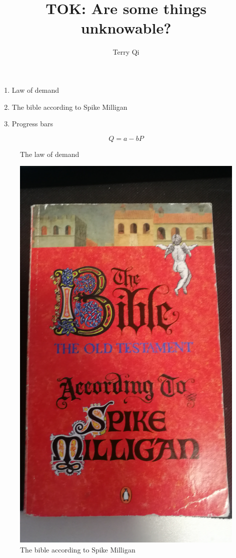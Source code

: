 \documentclass[a4paper,12pt]{article}
\title{TOK: Are some things unknowable?}
\author{Terry Qi}
\begin{document}
\maketitle
\begin{enumerate}
 \item Law of demand
 \item The bible according to Spike Milligan
 \item Progress bars
\end{enumerate}

\begin{figure}[h!]
 \centering
 \[
    Q = a - bP
 \]
 \caption{The law of demand}
 \label{fig:lod}
\end{figure}

\begin{figure}[h!]
 \centering
 \includegraphics[scale=0.05]{bible.jpg}
 \caption{The bible according to Spike Milligan}
 \label{fig:bible}
\end{figure}
\end{document}
